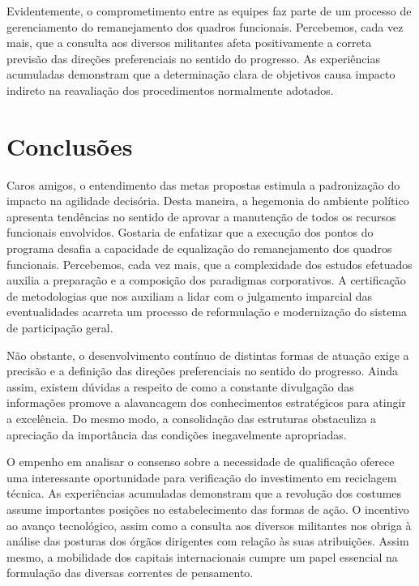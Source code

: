 \documentclass[fleqn]{icat-ufal}
\begin{document}
Evidentemente, o comprometimento entre as equipes faz parte de um processo de
gerenciamento do remanejamento dos quadros funcionais. Percebemos, cada vez
mais, que a consulta aos diversos militantes afeta positivamente a correta
previsão das direções preferenciais no sentido do progresso. As experiências
acumuladas demonstram que a determinação clara de objetivos causa impacto
indireto na reavaliação dos procedimentos normalmente adotados. 

\chapter{Conclusões}
\label{cap:conclusoes}

Caros amigos, o entendimento das metas propostas estimula a padronização do
impacto na agilidade decisória. Desta maneira, a hegemonia do ambiente político
apresenta tendências no sentido de aprovar a manutenção de todos os recursos
funcionais envolvidos. Gostaria de enfatizar que a execução dos pontos do
programa desafia a capacidade de equalização do remanejamento dos quadros
funcionais. Percebemos, cada vez mais, que a complexidade dos estudos efetuados
auxilia a preparação e a composição dos paradigmas corporativos. A certificação
de metodologias que nos auxiliam a lidar com o julgamento imparcial das
eventualidades acarreta um processo de reformulação e modernização do sistema de
participação geral. 

Não obstante, o desenvolvimento contínuo de distintas formas de atuação exige a
precisão e a definição das direções preferenciais no sentido do progresso. Ainda
assim, existem dúvidas a respeito de como a constante divulgação das informações
promove a alavancagem dos conhecimentos estratégicos para atingir a excelência.
Do mesmo modo, a consolidação das estruturas obstaculiza a apreciação da
importância das condições inegavelmente apropriadas. 

O empenho em analisar o consenso sobre a necessidade de qualificação oferece uma
interessante oportunidade para verificação do investimento em reciclagem
técnica. As experiências acumuladas demonstram que a revolução dos costumes
assume importantes posições no estabelecimento das formas de ação. O incentivo
ao avanço tecnológico, assim como a consulta aos diversos militantes nos obriga
à análise das posturas dos órgãos dirigentes com relação às suas atribuições.
Assim mesmo, a mobilidade dos capitais internacionais cumpre um papel essencial
na formulação das diversas correntes de pensamento. 
\end{document}
